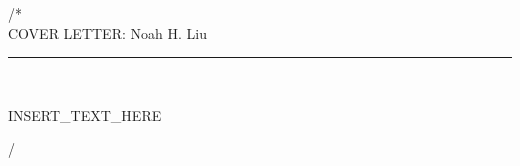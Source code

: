 \documentclass[a4paper,11pt]{extarticle}
\begin{document}
\pagecolor{darkbg}
\color{commentcolor}
\raggedright %

\noindent /*\\
\noindent COVER LETTER: Noah H. Liu\\
\noindent \rule{\textwidth}{0.4pt}\\
\vspace{0.5cm}

INSERT_TEXT_HERE

\vspace{0.5cm}
\noindent */\\
\end{document}
